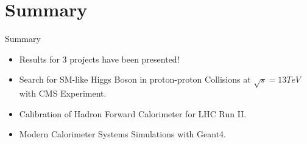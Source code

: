 \documentclass[pdf, 9pt]{beamer}
\begin{document}

%
%
\section*{Summary}
  \begin{frame}{Summary}
    \begin{itemize}
      \item Results for \alert{3 projects} have been presented!
      \item \alert{Search for SM-like Higgs Boson} in proton-proton Collisions at $\sqrt{s}=13 TeV$ with CMS Experiment.
      \item \alert{Calibration of Hadron Forward Calorimeter} for LHC Run II.
      \item \alert{Modern Calorimeter Systems Simulations} with Geant4.
    \end{itemize}
  \end{frame}

%
%
\end{document}
